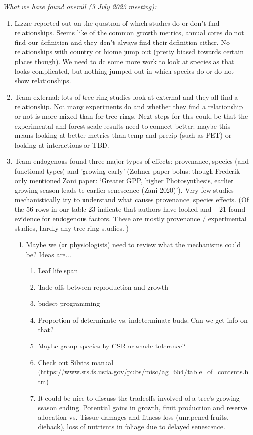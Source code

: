 \documentclass[11pt,letter]{article}
\begin{document}
\emph{What we have found overall (3 July 2023 meeting):}
\begin{enumerate}
\item Lizzie reported out on the question of which studies do or don't find relationships. Seems like of the common growth metrics, annual cores do not find our definition and they don't always find their definition either.  No relationships with country or biome jump out (pretty biased towards certain places though). We need to do some more work to look at species as that looks complicated,  but nothing jumped out in which species do or do not show relationships. 
\item Team external: lots of tree ring studies look at external and they all find a relationship. Not many experiments do and whether they find a relationship or not is more mixed than for tree rings. Next steps for this could be that the experimental and forest-scale results need to connect better: maybe this means looking at better metrics than temp and precip (such as PET) or looking at interactions or TBD.
\item Team endogenous found three major types of effects: provenance, species (and functional types) and 'growing early' (Zohner paper bolus; though Frederik only mentioned Zani paper: `Greater GPP, higher Photosynthesis, earlier growing season leads to earlier senescence (Zani 2020)'). Very few studies mechanistically try to understand what causes provenance, species effects. (Of the 56 rows in our table 23 indicate that authors have looked and ~ 21 found evidence for endogenous factors. These are mostly provenance / experimental studies, hardly any tree ring studies.  )
\begin{enumerate}
\item Maybe we (or physiologists) need to review what the mechanisms could be? Ideas are... 
\begin{enumerate}
\item Leaf life span
\item Tade-offs between reproduction and growth
\item budset programming
\item Proportion of determinate vs. indeterminate buds. Can we get info on that?
\item Maybe group species by CSR or shade tolerance?
\item Check out Silvics manual (\url{https://www.srs.fs.usda.gov/pubs/misc/ag_654/table_of_contents.htm})
\item It could be nice to discuss the tradeoffs involved of a tree’s growing season ending. Potential gains in growth, fruit production and reserve allocation vs. Tissue damages and fitness loss (unripened fruits, dieback), loss of nutrients in foliage due to delayed senescence.

\end{enumerate}
\end{enumerate}
\end{enumerate}
\end{document}
